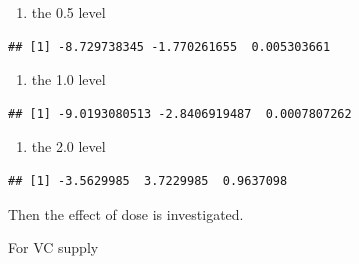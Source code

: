 \documentclass[
]{article}
\newenvironment{Shaded}{\begin{snugshade}}{\end{snugshade}}
\newcommand{\DataTypeTok}[1]{\textcolor[rgb]{0.13,0.29,0.53}{#1}}
\newcommand{\FloatTok}[1]{\textcolor[rgb]{0.00,0.00,0.81}{#1}}
\newcommand{\KeywordTok}[1]{\textcolor[rgb]{0.13,0.29,0.53}{\textbf{#1}}}
\newcommand{\NormalTok}[1]{#1}
\newcommand{\OperatorTok}[1]{\textcolor[rgb]{0.81,0.36,0.00}{\textbf{#1}}}
\newcommand{\OtherTok}[1]{\textcolor[rgb]{0.56,0.35,0.01}{#1}}
\newcommand{\StringTok}[1]{\textcolor[rgb]{0.31,0.60,0.02}{#1}}
\providecommand{\tightlist}{%
  \setlength{\itemsep}{0pt}\setlength{\parskip}{0pt}}
\begin{document}
\begin{enumerate}
\def\labelenumi{\arabic{enumi}.}
\tightlist
\item
  the 0.5 level
\end{enumerate}

\begin{Shaded}
\end{Shaded}

\begin{verbatim}
## [1] -8.729738345 -1.770261655  0.005303661
\end{verbatim}

\begin{enumerate}
\def\labelenumi{\arabic{enumi}.}
\setcounter{enumi}{1}
\tightlist
\item
  the 1.0 level
\end{enumerate}

\begin{verbatim}
## [1] -9.0193080513 -2.8406919487  0.0007807262
\end{verbatim}

\begin{enumerate}
\def\labelenumi{\arabic{enumi}.}
\setcounter{enumi}{2}
\tightlist
\item
  the 2.0 level
\end{enumerate}

\begin{verbatim}
## [1] -3.5629985  3.7229985  0.9637098
\end{verbatim}

Then the effect of dose is investigated.

For VC supply
\end{document}
